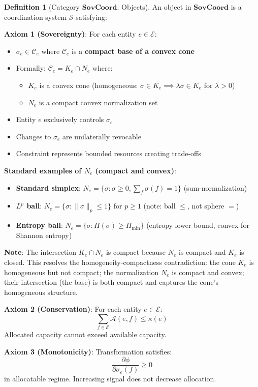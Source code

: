 \documentclass[11pt,a4paper]{article}
\theoremstyle{definition}
\newtheorem{definition}[theorem]{Definition}
\theoremstyle{remark}
\newcommand{\E}{\mathcal{E}}
\newcommand{\A}{\mathcal{A}}
\newcommand{\C}{\mathcal{C}}
\newcommand{\SovCoord}{\mathbf{SovCoord}}
\begin{document}
\begin{definition}[Category $\SovCoord$: Objects]
An object in $\SovCoord$ is a coordination system $\mathcal{S}$ satisfying:

\textbf{Axiom 1 (Sovereignty)}: For each entity $e \in \E$:
\begin{itemize}
\item $\sigma_e \in \C_e$ where $\C_e$ is a \textbf{compact base of a convex cone}
\item Formally: $\C_e = K_e \cap N_e$ where:
  \begin{itemize}
  \item $K_e$ is a convex cone (homogeneous: $\sigma \in K_e \implies \lambda\sigma \in K_e$ for $\lambda > 0$)
  \item $N_e$ is a compact convex normalization set
  \end{itemize}
\item Entity $e$ exclusively controls $\sigma_e$
\item Changes to $\sigma_e$ are unilaterally revocable
\item Constraint represents bounded resources creating trade-offs
\end{itemize}

\textbf{Standard examples of $N_e$ (compact and convex)}:
\begin{itemize}
\item \textbf{Standard simplex}: $N_e = \{\sigma : \sigma \geq 0, \sum_f \sigma(f) = 1\}$ (sum-normalization)
\item \textbf{$L^p$ ball}: $N_e = \{\sigma : \|\sigma\|_p \leq 1\}$ for $p \geq 1$ (note: ball $\leq$, not sphere $=$)
\item \textbf{Entropy ball}: $N_e = \{\sigma : H(\sigma) \geq H_{\min}\}$ (entropy lower bound, convex for Shannon entropy)
\end{itemize}

\textbf{Note}: The intersection $K_e \cap N_e$ is compact because $N_e$ is compact and $K_e$ is closed. This resolves the homogeneity-compactness contradiction: the cone $K_e$ is homogeneous but not compact; the normalization $N_e$ is compact and convex; their intersection (the base) is both compact and captures the cone's homogeneous structure.

\textbf{Axiom 2 (Conservation)}: For each entity $e \in \E$:
\[ \sum_{f \in \E} \A(e,f) \le \kappa(e) \]
Allocated capacity cannot exceed available capacity.

\textbf{Axiom 3 (Monotonicity)}: Transformation satisfies:
\[ \frac{\partial \phi}{\partial \sigma_e(f)} \ge 0 \]
in allocatable regime. Increasing signal does not decrease allocation.
\end{definition}
\end{document}
